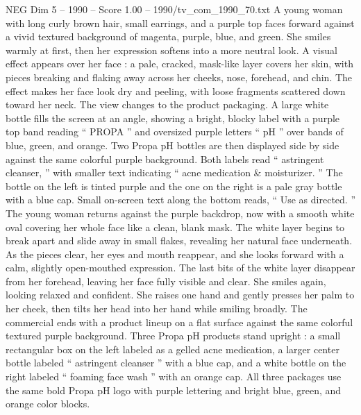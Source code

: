 \begin{textsample}{NEG Dim 5 – 1990 – Score 1.00 – 1990/tv\_com\_1990\_70.txt}  \label{ex:f5_neg_089}
A young woman with long curly brown hair, small earrings, and a purple top faces forward against a vivid textured background of magenta, purple, blue, and green.
She smiles warmly at first, then her expression softens into a more neutral look.
A visual effect appears over her face : a pale, cracked, mask-like layer covers her skin, with pieces breaking and flaking away across her cheeks, nose, forehead, and chin.
The effect makes her face look dry and peeling, with loose fragments scattered down toward her neck.
The view changes to the product packaging.
A large white bottle fills the screen at an angle, showing a bright, blocky label with a purple top band reading “ PROPA ” and oversized purple letters “ pH ” over bands of blue, green, and orange.
Two Propa pH bottles are then displayed side by side against the same colorful purple background.
Both labels read “ astringent cleanser, ” with smaller text indicating “ acne medication \& moisturizer. ” The bottle on the left is tinted purple and the one on the right is a pale gray bottle with a blue cap.
Small on-screen text along the bottom reads, “ Use as directed. ” The young woman returns against the purple backdrop, now with a smooth white oval covering her whole face like a clean, blank mask.
The white layer begins to break apart and slide away in small flakes, revealing her natural face underneath.
As the pieces clear, her eyes and mouth reappear, and she looks forward with a calm, slightly open-mouthed expression.
The last bits of the white layer disappear from her forehead, leaving her face fully visible and clear.
She smiles again, looking relaxed and confident.
She raises one hand and gently presses her palm to her cheek, then tilts her head into her hand while smiling broadly.
The commercial ends with a product lineup on a flat surface against the same colorful textured purple background.
Three Propa pH products stand upright : a small rectangular box on the left labeled as a gelled acne medication, a larger center bottle labeled “ astringent cleanser ” with a blue cap, and a white bottle on the right labeled “ foaming face wash ” with an orange cap.
All three packages use the same bold Propa pH logo with purple lettering and bright blue, green, and orange color blocks.

\end{textsample}
